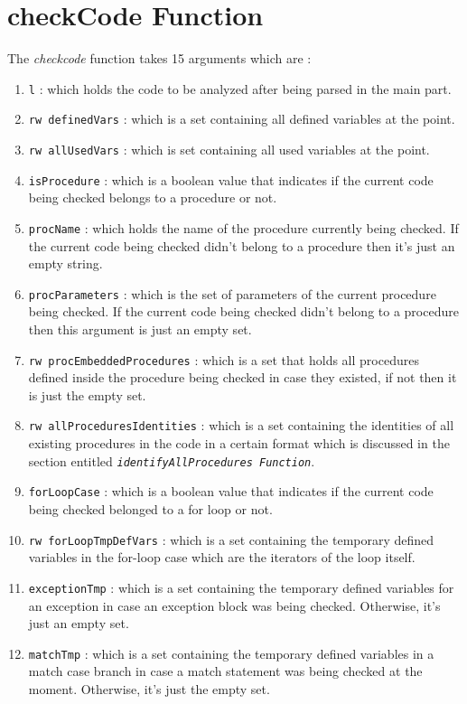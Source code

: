 \documentclass[11pt]{report}
\begin{document}
\section{checkCode Function}

The \textsl{checkcode} function takes 15 arguments which are :
\begin{enumerate}
\item \texttt{l} : which holds the code to be analyzed after being parsed in the main part.
\item \texttt{rw definedVars} : which is a set containing all defined variables at the point.
\item \texttt{rw allUsedVars} : which is set containing all used variables at the point.
\item \texttt{isProcedure} : which is a boolean value that indicates if the current code being checked belongs to a procedure or not.
\item \texttt{procName} : which holds the name of the procedure currently being checked. If the current code being checked didn't belong to a procedure then it's just an empty string. 
\item \texttt{procParameters} : which is the set of parameters of the current procedure being checked. If the current code being checked didn't belong to a procedure then this argument is just an empty set.
\item \texttt{rw procEmbeddedProcedures} : which is a set that holds all procedures defined inside the procedure being checked in case they existed, if not then it is just the empty set.
\item \texttt{rw allProceduresIdentities} : which is a set containing the identities of all existing procedures in the code in a certain format which is discussed in the section entitled \texttt{\textsl{identifyAllProcedures Function}}.
\item \texttt{forLoopCase} : which is a boolean value that indicates if the current code being checked belonged to a for loop or not.
\item \texttt{rw forLoopTmpDefVars} : which is a set containing the temporary defined variables in the for-loop case which are the iterators of the loop itself.
\item \texttt{exceptionTmp} : which is a set containing the temporary defined variables for an exception in case an exception block was being checked. Otherwise, it's just an empty set.
\item \texttt{matchTmp} : which is a set containing the temporary defined variables in a match case branch in case a match statement was being checked at the moment. Otherwise, it's just the empty set.

\end{enumerate}
\end{document}

